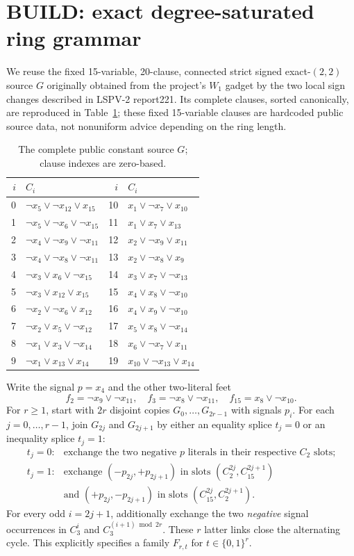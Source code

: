 \documentclass[11pt]{article}
\begin{document}
\section{BUILD: exact degree-saturated ring grammar}
We reuse the fixed 15-variable, 20-clause, connected strict signed exact-$(2,2)$ source $G$ originally obtained from the project's $W_1$ gadget by the two local sign changes described in LSPV-2 report221. Its complete clauses, sorted canonically, are reproduced in Table~\ref{tab:source}; these fixed 15-variable clauses are hardcoded public source data, not nonuniform advice depending on the ring length.
\begin{table}[ht]\centering\small
\begin{tabular}{r l r l}\toprule
$i$&$C_i$ &$i$&$C_i$\\\midrule
0&$\neg x_5\vee\neg x_{12}\vee x_{15}$&10&$x_1\vee\neg x_7\vee x_{10}$\\
1&$\neg x_5\vee\neg x_6\vee\neg x_{15}$&11&$x_1\vee x_7\vee x_{13}$\\
2&$\neg x_4\vee\neg x_9\vee\neg x_{11}$&12&$x_2\vee\neg x_9\vee x_{11}$\\
3&$\neg x_4\vee\neg x_8\vee\neg x_{11}$&13&$x_2\vee\neg x_8\vee x_9$\\
4&$\neg x_3\vee x_6\vee\neg x_{15}$&14&$x_3\vee x_7\vee\neg x_{13}$\\
5&$\neg x_3\vee x_{12}\vee x_{15}$&15&$x_4\vee x_8\vee\neg x_{10}$\\
6&$\neg x_2\vee\neg x_6\vee x_{12}$&16&$x_4\vee x_9\vee\neg x_{10}$\\
7&$\neg x_2\vee x_5\vee\neg x_{12}$&17&$x_5\vee x_8\vee\neg x_{14}$\\
8&$\neg x_1\vee x_3\vee\neg x_{14}$&18&$x_6\vee\neg x_7\vee x_{11}$\\
9&$\neg x_1\vee x_{13}\vee x_{14}$&19&$x_{10}\vee\neg x_{13}\vee x_{14}$\\\bottomrule
\end{tabular}
\caption{The complete public constant source $G$; clause indexes are zero-based.}\label{tab:source}\end{table}

Write the signal $p=x_4$ and the other two-literal feet
\[
 f_2=\neg x_9\vee\neg x_{11},\quad
 f_3=\neg x_8\vee\neg x_{11},\quad
 f_{15}=x_8\vee\neg x_{10}.
\]
For $r\ge1$, start with $2r$ disjoint copies $G_0,\ldots,G_{2r-1}$ with signals $p_i$. For each $j=0,\ldots,r-1$, join $G_{2j}$ and $G_{2j+1}$ by either an equality splice $t_j=0$ or an inequality splice $t_j=1$:
\[
 \begin{array}{ll}
 t_j=0:&\text{exchange the two negative $p$ literals in their respective $C_2$ slots;}\\
 t_j=1:&\text{exchange $(-p_{2j},+p_{2j+1})$ in slots $(C_2^{2j},C_{15}^{2j+1})$}\\
 &\text{and $(+p_{2j},-p_{2j+1})$ in slots $(C_{15}^{2j},C_2^{2j+1})$.}
 \end{array}
\]
For every odd $i=2j+1$, additionally exchange the two \emph{negative} signal occurrences in $C_3^{i}$ and $C_3^{(i+1)\bmod 2r}$. These $r$ latter links close the alternating cycle. This explicitly specifies a family $F_{r,t}$ for $t\in\{0,1\}^r$.
\end{document}

